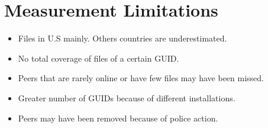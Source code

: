 \documentclass[notes]{beamer}
\begin{document}
\section{Measurement Limitations}
\begin{frame}

\begin{itemize}

\item[\checkmark]Files in U.S mainly. Others countries are underestimated.

\item[\checkmark]No total coverage of files of a certain GUID.

\item[\checkmark]Peers that are rarely online or have few files may have been missed.

\item[\checkmark]Greater number of GUIDs because of different installations.

\item[\checkmark]Peers may have been removed because of police action.

\end{itemize}

\end{frame}
\end{document}
